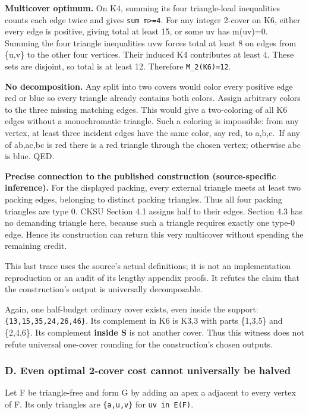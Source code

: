 \documentclass[11pt]{article}
\begin{document}
\textbf{Multicover optimum.} On K4, summing its four triangle-load inequalities counts each edge twice and gives \texttt{sum\ m\textgreater{}=4}. For any integer 2-cover on K6, either every edge is positive, giving total at least 15, or some uv has m(uv)=0. Summing the four triangle inequalities uvw forces total at least 8 on edges from \{u,v\} to the other four vertices. Their induced K4 contributes at least 4. These sets are disjoint, so total is at least 12. Therefore \texttt{M\_2(K6)=12}.

\textbf{No decomposition.} Any split into two covers would color every positive edge red or blue so every triangle already contains both colors. Assign arbitrary colors to the three missing matching edges. This would give a two-coloring of all K6 edges without a monochromatic triangle. Such a coloring is impossible: from any vertex, at least three incident edges have the same color, say red, to a,b,c.~If any of ab,ac,bc is red there is a red triangle through the chosen vertex; otherwise abc is blue. QED.

\textbf{Precise connection to the published construction (source-specific inference).} For the displayed packing, every external triangle meets at least two packing edges, belonging to distinct packing triangles. Thus all four packing triangles are type 0. CKSU Section 4.1 assigns half to their edges. Section 4.3 has no demanding triangle here, because such a triangle requires exactly one type-0 edge. Hence its construction can return this very multicover without spending the remaining credit.

This last trace uses the source's actual definitions; it is not an implementation reproduction or an audit of its lengthy appendix proofs. It refutes the claim that the construction's output is universally decomposable.

Again, one half-budget ordinary cover exists, even inside the support: \texttt{\{13,15,35,24,26,46\}}. Its complement in K6 is K3,3 with parts \{1,3,5\} and \{2,4,6\}. Its complement \textbf{inside S} is not another cover. Thus this witness does not refute universal one-cover rounding for the construction's chosen outputs.

\subsubsection{D. Even optimal 2-cover cost cannot universally be halved}\label{d.-even-optimal-2-cover-cost-cannot-universally-be-halved}

Let F be triangle-free and form G by adding an apex a adjacent to every vertex of F. Its only triangles are \texttt{\{a,u,v\}} for \texttt{uv\ in\ E(F)}.
\end{document}
